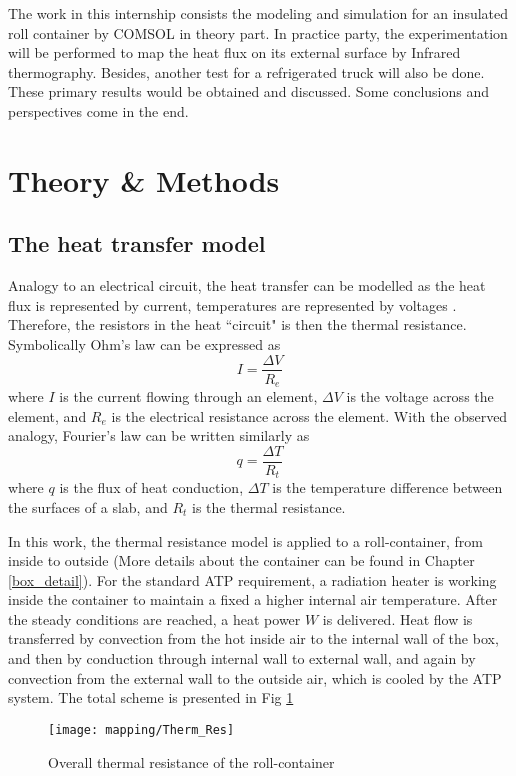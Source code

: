 The work in this internship consists the modeling and simulation for an insulated roll container by COMSOL in theory part. In practice party, the experimentation will be performed to map the heat flux on its external surface by Infrared thermography. Besides, another test for a refrigerated truck will also be done. These primary results would be obtained and discussed. Some conclusions and perspectives come in the end.


\section{Theory \& Methods}
\subsection{The heat transfer model}
Analogy to an electrical circuit, the heat transfer can be modelled as the heat flux is represented by current, temperatures are represented by voltages \citep{Therm_Re}. Therefore, the resistors in the heat ``circuit" is then the thermal resistance. Symbolically Ohm’s law can be expressed as
\begin{equation}
I = \frac{\Delta V}{R_e}
\end{equation}
where $I$ is the current flowing through an element, $\Delta V$ is the voltage across the element, and $R_e$ is the electrical resistance across the element. With the observed analogy, Fourier’s law can be written similarly as
\begin{equation}
q = \frac{\Delta T}{R_t}
\end{equation}
where $q$ is the flux of heat conduction, $\Delta T$ is the temperature difference between the surfaces of a slab, and $R_t$ is the thermal resistance.

In this work, the thermal resistance model is applied to a roll-container, from inside to outside (More details about the container can be found in Chapter \ref{box_detail}). For the standard ATP requirement, a radiation heater is working inside the container to maintain a fixed a higher internal air temperature. After the steady conditions are reached, a heat power $W$ is delivered. Heat flow is transferred by convection from the hot inside air to the internal wall of the box, and then by conduction through internal wall to external wall, and again by convection from the external wall to the outside air, which is cooled by the ATP system. The total scheme is presented in Fig \ref{Therm_Res}
\begin{figure}[!htpb]
	\centering
	\texttt{[image: mapping/Therm\_Res]}
	\caption{Overall thermal resistance of the roll-container}
	\label{Therm_Res}
\end{figure}

